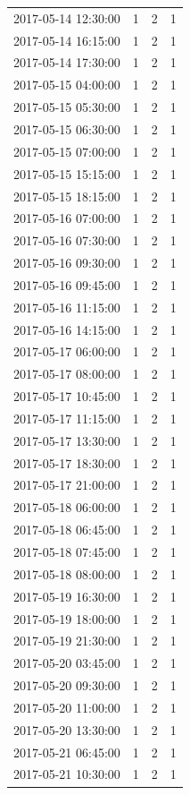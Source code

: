 \begin{tabular}{lrrr}
2017-05-14 12:30:00 & 1 & 2 & 1 \\
2017-05-14 16:15:00 & 1 & 2 & 1 \\
2017-05-14 17:30:00 & 1 & 2 & 1 \\
2017-05-15 04:00:00 & 1 & 2 & 1 \\
2017-05-15 05:30:00 & 1 & 2 & 1 \\
2017-05-15 06:30:00 & 1 & 2 & 1 \\
2017-05-15 07:00:00 & 1 & 2 & 1 \\
2017-05-15 15:15:00 & 1 & 2 & 1 \\
2017-05-15 18:15:00 & 1 & 2 & 1 \\
2017-05-16 07:00:00 & 1 & 2 & 1 \\
2017-05-16 07:30:00 & 1 & 2 & 1 \\
2017-05-16 09:30:00 & 1 & 2 & 1 \\
2017-05-16 09:45:00 & 1 & 2 & 1 \\
2017-05-16 11:15:00 & 1 & 2 & 1 \\
2017-05-16 14:15:00 & 1 & 2 & 1 \\
2017-05-17 06:00:00 & 1 & 2 & 1 \\
2017-05-17 08:00:00 & 1 & 2 & 1 \\
2017-05-17 10:45:00 & 1 & 2 & 1 \\
2017-05-17 11:15:00 & 1 & 2 & 1 \\
2017-05-17 13:30:00 & 1 & 2 & 1 \\
2017-05-17 18:30:00 & 1 & 2 & 1 \\
2017-05-17 21:00:00 & 1 & 2 & 1 \\
2017-05-18 06:00:00 & 1 & 2 & 1 \\
2017-05-18 06:45:00 & 1 & 2 & 1 \\
2017-05-18 07:45:00 & 1 & 2 & 1 \\
2017-05-18 08:00:00 & 1 & 2 & 1 \\
2017-05-19 16:30:00 & 1 & 2 & 1 \\
2017-05-19 18:00:00 & 1 & 2 & 1 \\
2017-05-19 21:30:00 & 1 & 2 & 1 \\
2017-05-20 03:45:00 & 1 & 2 & 1 \\
2017-05-20 09:30:00 & 1 & 2 & 1 \\
2017-05-20 11:00:00 & 1 & 2 & 1 \\
2017-05-20 13:30:00 & 1 & 2 & 1 \\
2017-05-21 06:45:00 & 1 & 2 & 1 \\
2017-05-21 10:30:00 & 1 & 2 & 1 \\

\end{tabular}
